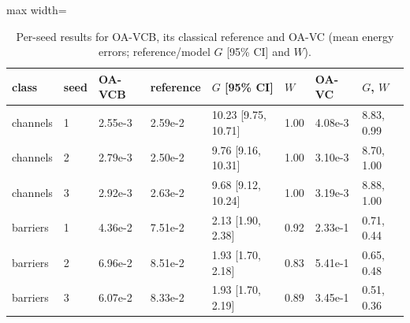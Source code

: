 \begin{table}[tbp]\centering\footnotesize\setlength{\tabcolsep}{4pt}
\caption{Per-seed results for OA-VCB, its classical reference and OA-VC (mean energy errors; reference/model $G$ [95\% CI] and $W$).}\label{tab:perseed}
\begin{adjustbox}{max width=\linewidth}
\begin{tabular}{llllllll}\toprule
class & seed & OA-VCB & reference & $G$ [95\% CI] & $W$ & OA-VC & $G$, $W$ \\\midrule
channels & 1 & 2.55e-3 & 2.59e-2 & 10.23 [9.75, 10.71] & 1.00 & 4.08e-3 & 8.83, 0.99 \\
channels & 2 & 2.79e-3 & 2.50e-2 & 9.76 [9.16, 10.31] & 1.00 & 3.10e-3 & 8.70, 1.00 \\
channels & 3 & 2.92e-3 & 2.63e-2 & 9.68 [9.12, 10.24] & 1.00 & 3.19e-3 & 8.88, 1.00 \\
\midrule
barriers & 1 & 4.36e-2 & 7.51e-2 & 2.13 [1.90, 2.38] & 0.92 & 2.33e-1 & 0.71, 0.44 \\
barriers & 2 & 6.96e-2 & 8.51e-2 & 1.93 [1.70, 2.18] & 0.83 & 5.41e-1 & 0.65, 0.48 \\
barriers & 3 & 6.07e-2 & 8.33e-2 & 1.93 [1.70, 2.19] & 0.89 & 3.45e-1 & 0.51, 0.36 \\
\bottomrule\end{tabular}
\end{adjustbox}
\end{table}

